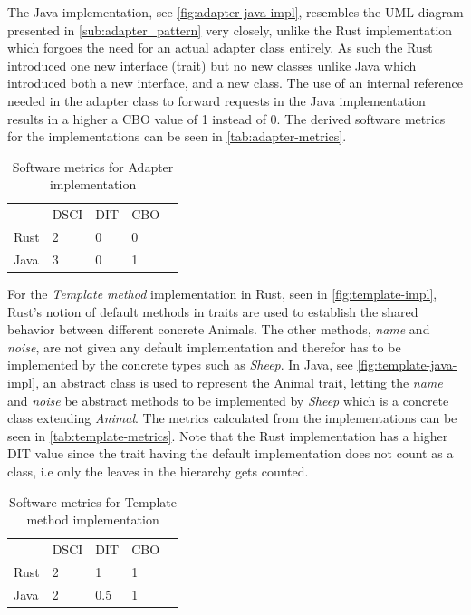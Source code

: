 \documentclass[conference]{IEEEtran}
\begin{document}
The Java implementation, see \autoref{fig:adapter-java-impl}, resembles the UML diagram presented in \autoref{sub:adapter_pattern} very closely, unlike the Rust implementation which forgoes the need for an actual adapter class entirely.
As such the Rust introduced one new interface (trait) but no new classes unlike Java which introduced both a new interface, and a new class.
The use of an internal reference needed in the adapter class to forward requests in the Java implementation results in a higher a CBO value of 1 instead of 0.
The derived software metrics for the implementations can be seen in \autoref{tab:adapter-metrics}.

\begin{table}[hbtp]
    \centering
    \caption{Software metrics for Adapter implementation}
    \label{tab:adapter-metrics}
    \begin{tabular}{lllll}
        & DSCI   & DIT  & CBO   &  \\
        Rust & 2 & 0    & 0     &  \\
        Java & 3 & 0    & 1     &  \\
    \end{tabular}
\end{table}

For the \emph{Template method} implementation in Rust, seen in \autoref{fig:template-impl}, Rust's notion of default methods in traits are used to establish the shared behavior between different concrete Animals.
The other methods, \emph{name} and \emph{noise}, are not given any default implementation and therefor has to be implemented by the concrete types such as \emph{Sheep}.
In Java, see \autoref{fig:template-java-impl}, an abstract class is used to represent the Animal trait, letting the \emph{name} and \emph{noise} be abstract methods to be implemented by \emph{Sheep} which is  a concrete class extending \emph{Animal}.
The metrics calculated from the implementations can be seen in \autoref{tab:template-metrics}.
Note that the Rust implementation has a higher DIT value since the trait having the default implementation does not count as a class, i.e only the leaves in the hierarchy gets counted.

\begin{table}[hbtp]
    \centering
    \caption{Software metrics for Template method implementation}
    \label{tab:template-metrics}
    \begin{tabular}{lllll}
        & DSCI   & DIT  & CBO   &  \\
        Rust & 2 & 1    & 1     &  \\
        Java & 2 & 0.5  & 1     &  \\
    \end{tabular}
\end{table}
\end{document}
